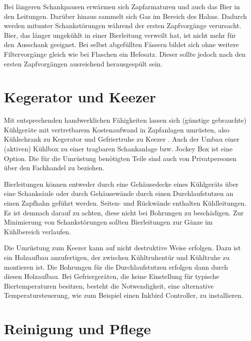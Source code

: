 \documentclass[a4paper,parskip=half]{scrartcl}
\begin{document}
Bei längeren Schankpausen erwärmen sich Zapfarmaturen und auch das Bier in den Leitungen. Darüber hinaus sammelt sich Gas im Bereich des Hahns. Dadurch werden mitunter Schankstörungen während der ersten Zapfvorgänge verursacht. Bier, das länger ungekühlt in einer Bierleitung verweilt hat, ist nicht mehr für den Ausschank geeignet. Bei selbst abgefüllten Fässern bildet sich ohne weitere Filtervorgänge gleich wie bei Flaschen ein Hefesatz. Dieser sollte jedoch nach den ersten Zapfvorgängen ausreichend herausgespült sein. \autocite{Krueger2015}

\section*{Kegerator und Keezer}

Mit entsprechenden handwerklichen Fähigkeiten lassen sich (günstige gebrauchte) Kühlgeräte mit vertretbarem Kostenaufwand in Zapfanlagen umrüsten, also Kühlschrank zu Kegerator \cite{Vitaly2019} und Gefriertruhe zu Keezer \autocite{HomebrewAcademy2021}. Auch der Umbau einer (aktiven) Kühlbox zu einer tragbaren Schankanlage bzw. Jockey Box ist eine Option. Die für die Umrüstung benötigten Teile sind auch von Privatpersonen über den Fachhandel zu beziehen.

Bierleitungen können entweder durch eine Gehäusedecke eines Kühlgeräts über eine Schanksäule oder durch Gehäusewände durch einen Durchlaufstutzen an einen Zapfhahn geführt werden. Seiten- und Rückwände enthalten Kühlleitungen. Es ist demnach darauf zu achten, diese nicht bei Bohrungen zu beschädigen. Zur Minimierung von Schankstörungen sollten Bierleitungen zur Gänze im Kühlbereich verlaufen.

Die Umrüstung zum Keezer kann auf nicht destruktive Weise erfolgen. Dazu ist ein Holzaufbau anzufertigen, der zwischen Kühltruhentür und Kühltruhe zu montieren ist. Die Bohrungen für die Durchlaufstutzen erfolgen dann durch diesen Holzaufbau. Bei Gefriergeräten, die keine Einstellung für typische Biertemperaturen besitzen, besteht die Notwendigkeit, eine alternative Temperatursteuerung, wie zum Beispiel einen Inkbird Controller, zu installieren.

\section*{Reinigung und Pflege}
\end{document}
